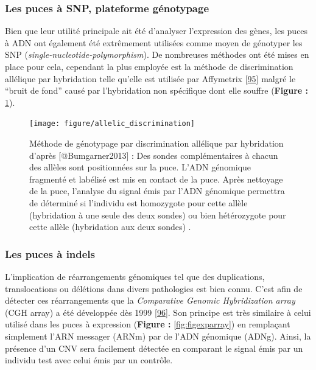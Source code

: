 \documentclass[12pt,twoside]{reedthesis}
\theoremstyle{definition}
\theoremstyle{definition}
\theoremstyle{remark}
\begin{document}
  \newpage
  
  \subsubsection{Les puces à SNP, plateforme
  génotypage}\label{les-puces-a-snp-plateforme-genotypage}
  
  Bien que leur utilité principale ait été d'analyser l'expression des
  gènes, les puces à ADN ont également été extrêmement utilisées comme
  moyen de génotyper les SNP (\emph{single-nucleotide-polymorphism}). De
  nombreuses méthodes ont été mises en place pour cela, cependant la plus
  employée est la méthode de discrimination allélique par hybridation
  telle qu'elle est utilisée par Affymetrix
  {[}\protect\hyperlink{ref-Wang1998}{95}{]} malgré le ``bruit de fond''
  causé par l'hybridation non spécifique dont elle souffre (\textbf{Figure
  :} \ref{fig:figallelicdisc}).
  
  \begin{figure}
  
  {\centering \texttt{[image: figure/allelic\_discrimination]} 
  
  }
  
  \caption[Méthode de génotypage par discrimination allélique par hybridation]{Méthode de génotypage par discrimination allélique par hybridation d'après [@Bumgarner2013] : Des sondes complémentaires à chacun des allèles sont positionnées sur la puce. L'ADN génomique fragmenté et labélisé est mis en contact de la puce. Après nettoyage de la puce, l'analyse du signal émis par l'ADN génomique permettra de déterminé si l'individu est homozygote pour cette allèle (hybridation à une seule des deux sondes) ou bien hétérozygote pour cette allèle (hybridation aux deux sondes) .}\label{fig:figallelicdisc}
  \end{figure}
  
  \newpage
  
  \subsubsection{Les puces à indels}\label{les-puces-a-indels}
  
  L'implication de réarrangements génomiques tel que des duplications,
  translocations ou délétions dans divers pathologies est bien connu.
  C'est afin de détecter ces réarrangements que la \emph{Comparative
  Genomic Hybridization array} (CGH array) a été développée dès 1999
  {[}\protect\hyperlink{ref-Brown1999}{96}{]}. Son principe est très
  similaire à celui utilisé dans les puces à expression (\textbf{Figure :}
  \ref{fig:figexparray}) en remplaçant simplement l'ARN messager (ARNm)
  par de l'ADN génomique (ADNg). Ainsi, la présence d'un CNV sera
  facilement détectée en comparant le signal émis par un individu test
  avec celui émis par un contrôle.
  
\end{document}
